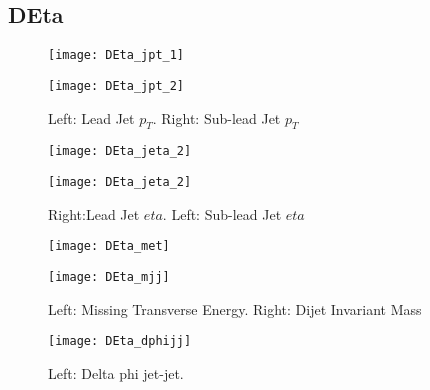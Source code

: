 \documentclass[a4paper,10pt]{article}
\begin{document}
\clearpage
\subsection{DEta}

\begin{figure}[!h]
\centering
\begin{minipage}[!h]{0.4\linewidth}
\centering
\texttt{[image: DEta\_jpt\_1]}
\end{minipage}%
\begin{minipage}[!h]{0.4\linewidth}
  \texttt{[image: DEta\_jpt\_2]}
\end{minipage}
\caption{Left: Lead Jet $p_T$. Right: Sub-lead Jet $p_T$}
\end{figure}

\begin{figure}[!h]
\centering
\begin{minipage}[!h]{0.4\linewidth}
\centering
\texttt{[image: DEta\_jeta\_2]}
\end{minipage}%
\begin{minipage}[!h]{0.4\linewidth}
\centering
\texttt{[image: DEta\_jeta\_2]}
\end{minipage}
\caption{Right:Lead Jet $eta$. Left: Sub-lead Jet $eta$}
\end{figure}

\begin{figure}[!h]
\centering
\begin{minipage}[!h]{0.4\linewidth}
\centering
\texttt{[image: DEta\_met]}
\end{minipage}%
\begin{minipage}[!h]{0.4\linewidth}
\centering
\texttt{[image: DEta\_mjj]}
\end{minipage}
\caption{Left: Missing Transverse Energy. Right: Dijet Invariant Mass}
\end{figure}

\begin{figure}[!h]
\centering
\begin{minipage}[!h]{0.4\linewidth}
\centering
\texttt{[image: DEta\_dphijj]}
\end{minipage}%
\begin{minipage}[!h]{0.4\linewidth}
\centering
\end{minipage}
\caption{Left: Delta phi jet-jet.}
\end{figure}
\end{document}
